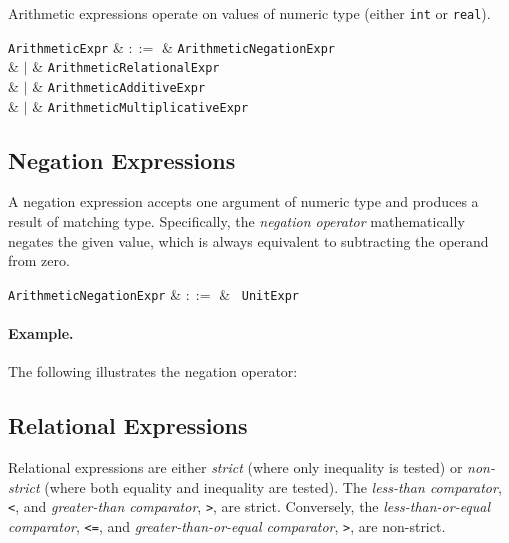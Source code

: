 Arithmetic expressions operate on values of numeric type (either \lstinline{int} or \lstinline{real}).

\begin{syntax}
  \verb+ArithmeticExpr+ & $::=$ & \verb+ArithmeticNegationExpr+\\
                  &  $|$  & \verb+ArithmeticRelationalExpr+\\
                  &  $|$  & \verb+ArithmeticAdditiveExpr+\\
                  &  $|$  & \verb+ArithmeticMultiplicativeExpr+\\
\end{syntax}


\subsection{Negation Expressions}
\label{c_expr_negation}

A negation expression accepts one argument of numeric type and produces a result of matching type.  Specifically, the {\em negation operator} mathematically negates the given value, which is always equivalent to subtracting the operand from zero.

\begin{syntax}
\verb+ArithmeticNegationExpr+ & $::=$ & \token{-}\ \verb+UnitExpr+\\
\end{syntax}

\paragraph{Example.} The following illustrates the negation operator:




\subsection{Relational Expressions}
\label{c_expr_relational}
Relational expressions are either {\em strict} (where only inequality is tested)  or {\em non-strict} (where both equality and inequality are tested).  The {\em less-than comparator}, \lstinline{<}, and {\em greater-than comparator}, \lstinline{>}, are strict.  Conversely, the {\em less-than-or-equal comparator}, \lstinline{<=}, and {\em greater-than-or-equal comparator}, \lstinline{>}, are non-strict.

